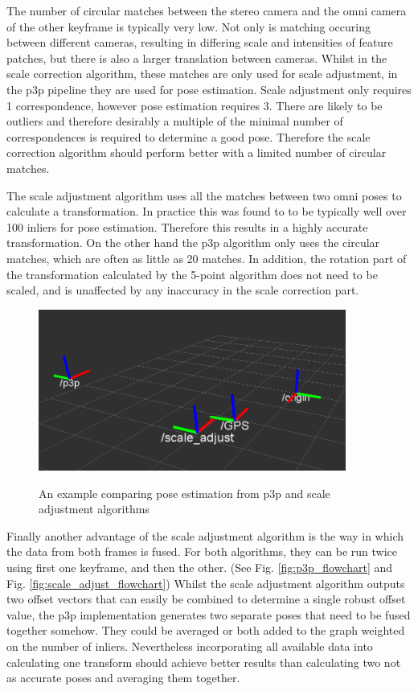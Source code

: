 The number of circular matches between the stereo camera and the omni camera of the other keyframe is typically very low.  Not only is matching occuring between different cameras, resulting in differing scale and intensities of feature patches, but there is also a larger translation between cameras. Whilst in the scale correction algorithm, these matches are only used for scale adjustment, in the p3p pipeline they are used for pose estimation.  Scale adjustment only requires 1 correspondence, however pose estimation requires 3.  There are likely to be outliers and therefore desirably a multiple of the minimal number of correspondences is required to determine a good pose.  Therefore the scale correction algorithm should perform better with a limited number of circular matches.

The scale adjustment algorithm uses all the matches between two omni poses to calculate a transformation.  In practice this was found to to be typically well over 100 inliers for pose estimation.  Therefore this results in a highly accurate transformation.  On the other hand the p3p algorithm only uses the circular matches, which are often as little as 20 matches.  In addition, the rotation part of the transformation calculated by the 5-point algorithm does not need to be scaled, and is unaffected by any inaccuracy in the scale correction part.

\begin{figure}[h]
  \centering
    \includegraphics[width=0.9\textwidth]{chapters/images/scale_vs_p3p_1}\\
  \caption{An example comparing pose estimation from p3p and scale adjustment algorithms}
  \label{fig:scale_vs_p3p}
\end{figure}


Finally another advantage of the scale adjustment algorithm is the way in which the data from both frames is fused.  For both algorithms, they can be run twice using first one keyframe, and then the other. (See Fig. \ref{fig:p3p_flowchart} and Fig. \ref{fig:scale_adjust_flowchart})   Whilst the scale adjustment algorithm outputs two offset vectors that can easily be combined to determine a single robust offset value, the p3p implementation generates two separate poses that need to be fused together somehow.  They could be averaged or both added to the graph weighted on the number of inliers. Nevertheless incorporating all available data into calculating one transform should achieve better results than calculating two not as accurate poses and averaging them together.

